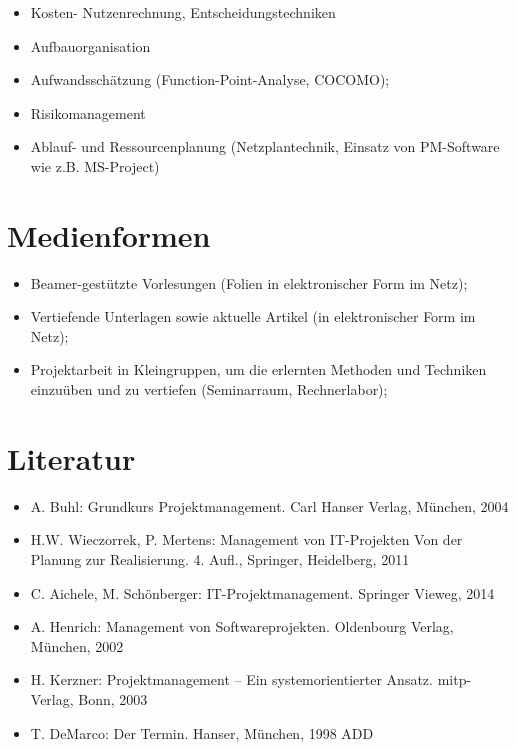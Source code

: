 \begin{itemize}
\tightlist
\item
  Kosten- Nutzenrechnung, Entscheidungstechniken
\item
  Aufbauorganisation
\item
  Aufwandsschätzung (Function-Point-Analyse, COCOMO);
\item
  Risikomanagement
\item
  Ablauf- und Ressourcenplanung (Netzplantechnik, Einsatz von
  PM-Software wie z.B. MS-Project)
\end{itemize}

\hypertarget{medienformenpathlabelmi-2017modulbeschreibungen-bachelorba_projektmanagement}{%
\section*{Medienformen\label{/mi-2017/modulbeschreibungen-bachelor/BA_Projektmanagement}}\label{medienformenpathlabelmi-2017modulbeschreibungen-bachelorba_projektmanagement}}

\begin{itemize}
\tightlist
\item
  Beamer-gestützte Vorlesungen (Folien in elektronischer Form im Netz);
\item
  Vertiefende Unterlagen sowie aktuelle Artikel (in elektronischer Form
  im Netz);
\item
  Projektarbeit in Kleingruppen, um die erlernten Methoden und Techniken
  einzuüben und zu vertiefen (Seminarraum, Rechnerlabor);
\end{itemize}

\hypertarget{literaturpathlabelmi-2017modulbeschreibungen-bachelorba_projektmanagement}{%
\section*{Literatur\label{/mi-2017/modulbeschreibungen-bachelor/BA_Projektmanagement}}\label{literaturpathlabelmi-2017modulbeschreibungen-bachelorba_projektmanagement}}

\begin{itemize}
\tightlist
\item
  A. Buhl: Grundkurs Projektmanagement. Carl Hanser Verlag, München,
  2004
\item
  H.W. Wieczorrek, P. Mertens: Management von IT-Projekten Von der
  Planung zur Realisierung. 4. Aufl., Springer, Heidelberg, 2011
\item
  C. Aichele, M. Schönberger: IT-Projektmanagement. Springer Vieweg,
  2014
\item
  A. Henrich: Management von Softwareprojekten. Oldenbourg Verlag,
  München, 2002
\item
  H. Kerzner: Projektmanagement -- Ein systemorientierter Ansatz.
  mitp-Verlag, Bonn, 2003
\item
  T. DeMarco: Der Termin. Hanser, München, 1998 ADD
\end{itemize}

